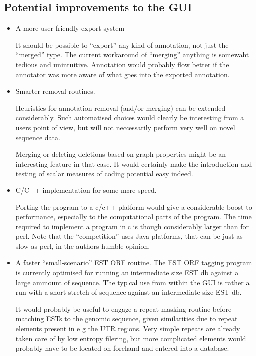 \subsection{Potential improvements to the GUI}
\begin{itemize}
        \item{A more user-friendly export system} 	        

	        It should be possible to ``export'' any kind of
	        annotation, not just the ``merged'' type. The current
	        workaround of ``merging'' anything is somewaht tedious
	        and unintuitive. Annotation would probably flow better
	        if the annotator was more aware of what goes into the
	        exported annotation.


	\item{Smarter removal routines.}

		Heuristics for annotation removal (and/or merging) can
		be extended considerably. Such automatised choices
		would clearly be interesting from a users point of
		view, but will not neccessarily perform very well on
		novel sequence data.

		Merging or deleting deletions based on graph properties
		might be an interesting feature in that case. It would 
		certainly make the introduction and testing of scalar
		measures of coding potential easy indeed.


	\item{C/C++ implementation for some more speed.}

		Porting the program to a c/c++ platform would give a
		considerable boost to performance, especially to the
		computational parts of the program. The time required
		to implement a program in c is though considerably
		larger than for perl. Note that the ``competition''
		uses Java-platforms, that can be just as slow as perl,
		in the authors humble opinion.

	\item{A faster ``small-scenario'' EST ORF routine.} 
		The EST ORF tagging program is currently optimised for
		running an intermediate size EST db against a large
		ammount of sequence. The typical use from within the
		GUI is rather a run with a short stretch of sequence
		against an intermediate size EST db.

		It would probably be useful to engage a repeat masking
		routine before  matching ESTs to the genomic sequence,
		given similarities due to repeat elements present in e
		g the  UTR  regions. Very  simple  repeats are already
		taken care of by low entropy filering, but more
		complicated elements would probably have to be located
		on forehand and entered into a database.



\end{itemize}
